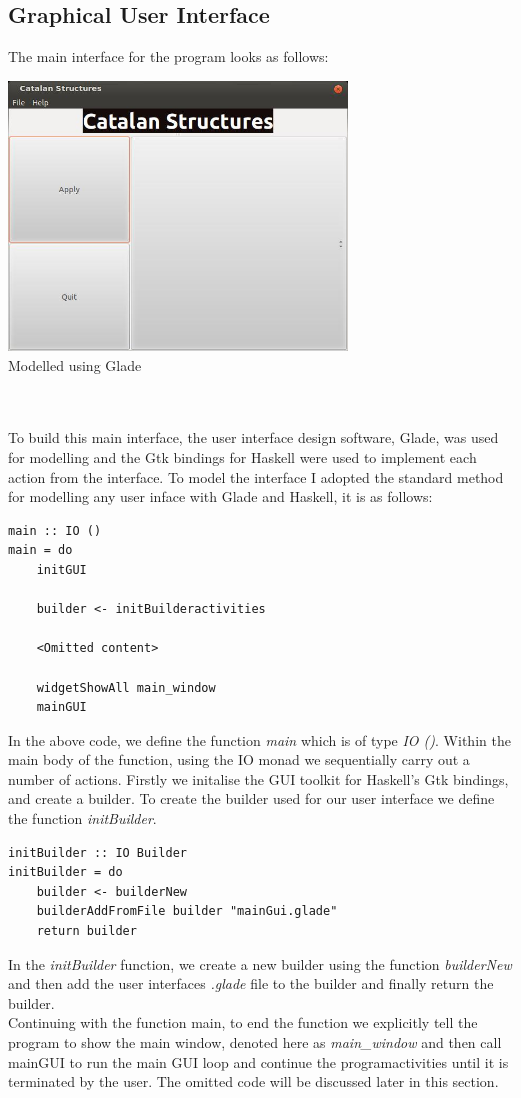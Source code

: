 \documentclass[12pt]{article}
\begin{document}
\subsection{Graphical User Interface}
The main interface for the program looks as follows:\\

{\centering
\includegraphics[width=90mm]{mainGUIScreenshot.jpeg}\\
\caption{Modelled using Glade \cite{Glade}}}\\
\\
To build this main interface, the user interface design software, Glade, was used for modelling and the Gtk bindings for Haskell were used to implement each action from the interface. To model the interface I adopted the standard method for modelling any user inface with Glade and Haskell, it is as follows:
\begin{lstlisting}
main :: IO ()
main = do
	initGUI 
	
	builder <- initBuilderactivities

	<Omitted content>

	widgetShowAll main_window
	mainGUI 
\end{lstlisting}
In the above code, we define the function {\it main} which is of type {\it IO ()}. Within the main body of the function, using the IO monad we sequentially carry out a number of actions. Firstly we initalise the GUI toolkit for Haskell's Gtk bindings, and create a builder. To create the builder used for our user interface we define the function {\it initBuilder}.
\begin{lstlisting}
initBuilder :: IO Builder
initBuilder = do
	builder <- builderNew 
	builderAddFromFile builder "mainGui.glade" 
	return builder
\end{lstlisting}
In the {\it initBuilder} function, we create a new builder using the function {\it builderNew} and then add the user interfaces {\it .glade} file to the builder and finally return the builder.\\
Continuing with the function main, to end the function we explicitly tell the program to show the main window, denoted here as {\it main\_window} and then call mainGUI to run the main GUI loop and continue the programactivities until it is terminated by the user. The omitted code will be discussed later in this section.
\end{document}
